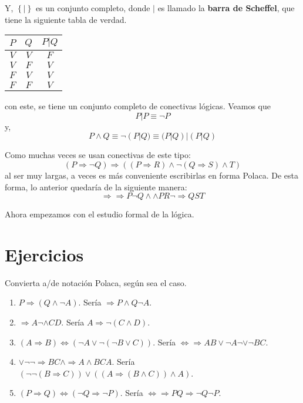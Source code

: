 \documentclass[12pt]{report}
\newcounter{it}
\theoremstyle{largebreak}
\begin{document}
    Y, $\left\{|\right\}$ es un conjunto completo, donde $|$ es llamado la \textbf{barra de Scheffel}, que tiene la siguiente tabla de verdad.

    \begin{center}
        \begin{tabular}{c c | c}
            \hline
            $P$ & $Q$ & $P|Q$ \\
            \hline
            $V$ & $V$ & $F$ \\
            $V$ & $F$ & $V$ \\
            $F$ & $V$ & $V$ \\
            $F$ & $F$ & $V$ \\
        \end{tabular}
    \end{center}
    con este, se tiene un conjunto completo de conectivas lógicas. Veamos que
    \begin{equation*}
        P|P\equiv\neg P
    \end{equation*}
    y,
    \begin{equation*}
        P\land Q\equiv \neg(P|Q)\equiv (P|Q)|(P|Q)
    \end{equation*}

    Como muchas veces se usan conectivas de este tipo:
    \begin{equation*}
        (P\Rightarrow \neg Q)\Rightarrow((P\Rightarrow R)\land\neg(Q\Rightarrow S)\land T)
    \end{equation*}
    al ser muy largas, a veces es más conveniente escribirlas en forma Polaca. De esta forma, lo anterior quedaría de la siguiente manera:
    \begin{equation*}
        \Rightarrow\Rightarrow P\neg Q\land\land PR\neg\Rightarrow Q S T 
    \end{equation*}

    Ahora empezamos con el estudio formal de la lógica.

    \section{Ejercicios}

    Convierta a/de notación Polaca, según sea el caso.

    \begin{enumerate}
        \item $P\Rightarrow(Q\land\neg A)$. Sería $\Rightarrow P\land Q \neg A$.
        \item $\Rightarrow  A\neg\land CD$. Sería $A\Rightarrow \neg(C\land D)$.
        \item $(A\Rightarrow B)\iff (\neg A\lor \neg(\neg B\lor C))$. Sería $\iff \Rightarrow A B \lor \neg A \neg \lor \neg B C$.
        \item $\lor\neg\neg\Rightarrow B C\land\Rightarrow A\land BCA$. Sería $(\neg\neg(B\Rightarrow C))\lor((A\Rightarrow (B\land C))\land A)$.
        \item $(P\Rightarrow Q)\iff (\neg Q\Rightarrow\neg P)$. Sería $\iff \Rightarrow P Q \Rightarrow \neg Q \neg P$.
    \end{enumerate}
\end{document}
